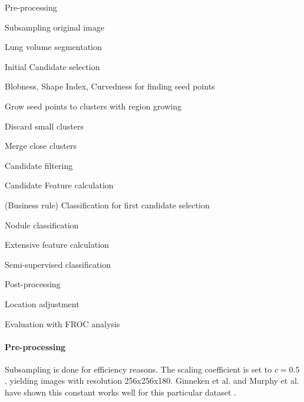 \documentclass[a4paper, 10pt, english, onecolumn]{article}
\newenvironment{packed_enum}{
\begin{enumerate}
  \setlength{\itemsep}{1pt}
  \setlength{\parskip}{0pt}
  \setlength{\parsep}{0pt}
}{\end{enumerate}}
\begin{document}
\begin{packed_enum}
  \item Pre-processing
  	\begin{packed_enum}
	  \item Subsampling original image
	  \item Lung volume segmentation
	\end{packed_enum}
  \item Initial Candidate selection
  	\begin{packed_enum}
	  \item Blobness, Shape Index, Curvedness for finding seed points 
	  \item Grow seed points to clusters with region growing
	  \item Discard small clusters
	  \item Merge close clusters
	\end{packed_enum}
  \item Candidate filtering
  	\begin{packed_enum}
	    \item Candidate Feature calculation
	    \item (Business rule) Classification for first candidate selection
	\end{packed_enum}
  \item Nodule classification
  	\begin{packed_enum}
	    \item Extensive feature calculation
	    \item Semi-supervised classification
	\end{packed_enum}
   \item Post-processing
   	\begin{packed_enum}
	  \item Location adjustment
	\end{packed_enum}
   \item Evaluation with FROC analysis
\end{packed_enum}

\paragraph{Pre-processing}
Subsampling is done for efficiency reasons.
The scaling coefficient is set to $c = 0.5$, yielding images with resolution 256x256x180.
Ginneken et al. and Murphy et al. have shown this constant works well for this particular dataset \cite{ginneken2010comparing}.
\end{document}
